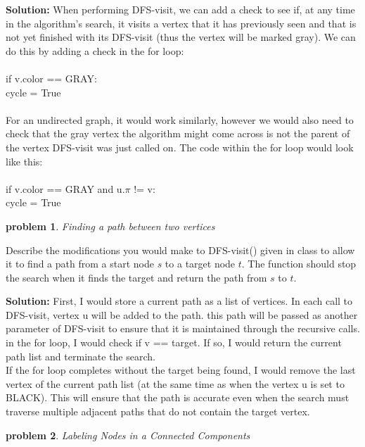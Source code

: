 \documentclass[10pt]{article}
\newcommand{\solution}[1]{\color{blue}\hfill\break\noindent\textbf{Solution:} #1\color{black}}
\newtheorem{problem}{\sc\color{cit}problem}
\begin{document}
\solution{
    When performing DFS-visit, we can add a check to see if, at any time in the algorithm's search, it visits a vertex that it has previously seen and that is not yet finished with its DFS-visit (thus the vertex will be marked gray). We can do this by adding a check in the for loop: \\ \\
    \null \quad if v.color == GRAY: \\
    \null \quad \null \quad cycle = True \\ \\
    For an undirected graph, it would work similarly, however we would also need to check that the gray vertex the algorithm might come across is not the parent of the vertex DFS-visit was just called on. The code within the for loop would look like this: \\ \\
    \null \quad if v.color == GRAY and u.$\pi$ != v: \\
    \null \quad \null \quad cycle = True
}


\begin{problem} Finding a path between two vertices \end{problem}

Describe the modifications you would make to DFS-visit() given in class to allow it to find a path from a start node $s$ to a target node $t$. The function should stop the search when it finds the target and return the path from $s$ to $t$.

\solution{
    First, I would store a current path as a list of vertices. In each call to DFS-visit, vertex u will be added to the path. this path will be passed as another parameter of DFS-visit to ensure that it is maintained through the recursive calls. in the for loop, I would check if v == target. If so, I would return the current path list and terminate the search. \\ If the for loop completes without the target being found, I would remove the last vertex of the current path list (at the same time as when the vertex u is set to BLACK). This will ensure that the path is accurate even when the search must traverse multiple adjacent paths that do not contain the target vertex.
}


\begin{problem} Labeling Nodes in a Connected Components \end{problem}
\end{document}
